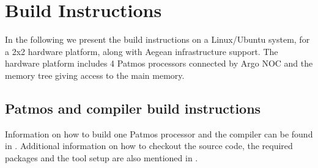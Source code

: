 \documentclass[a4paper,fontsize=10pt,twoside,DIV15,BCOR12mm,headinclude=true,footinclude=false,pagesize,bibtotoc]{scrbook}
\begin{document}
\chapter{Build Instructions}

In the following we present the build instructions on a Linux/Ubuntu system,
for a 2x2 hardware platform, along with Aegean infrastructure support.
The hardware platform includes 4 Patmos processors connected by Argo NOC
and the memory tree giving access to the main memory.


\section{Patmos and compiler build instructions}

Information on how to build one Patmos processor and the compiler can be found in \cite{patmos-handbook}.
Additional information on how to checkout the source code, the required packages and the tool setup
are also mentioned in \cite{patmos-handbook}.
\end{document}
